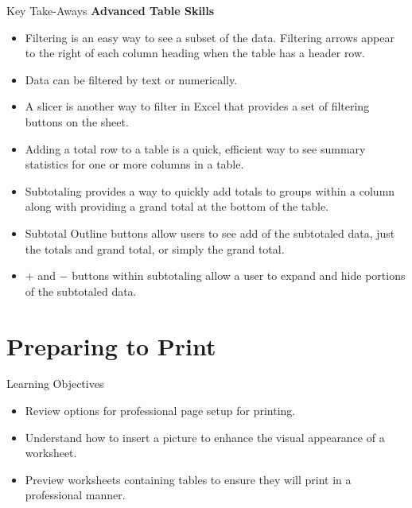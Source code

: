 \begin{center}
	\begin{tkwbox}{Key Take-Aways}
		\textbf{Advanced Table Skills}
		\\
		\begin{itemize}
			\setlength{\itemsep}{0pt}
			\setlength{\parskip}{0pt}
			\setlength{\parsep}{0pt}

			\item Filtering is an easy way to see a subset of the data. Filtering arrows appear to the right of each column heading when the table has a header row.
			\item Data can be filtered by text or numerically.
			\item A slicer is another way to filter in Excel that provides a set of filtering buttons on the sheet.
			\item Adding a total row to a table is a quick, efficient way to see summary statistics for one or more columns in a table.
			\item Subtotaling provides a way to quickly add totals to groups within a column along with providing a grand total at the bottom of the table.
			\item Subtotal Outline buttons allow users to see add of the subtotaled data, just the totals and grand total, or simply the grand total.
			\item $ + $ and $ - $ buttons within subtotaling allow a user to expand and hide portions of the subtotaled data.
			
		\end{itemize}
	\end{tkwbox}
\end{center}

\section{Preparing to Print}

\begin{center}
	\begin{objbox}{Learning Objectives}
		\begin{itemize}
			\setlength{\itemsep}{0pt}
			\setlength{\parskip}{0pt}
			\setlength{\parsep}{0pt}

			\item Review options for professional page setup for printing.
			\item Understand how to insert a picture to enhance the visual appearance of a worksheet.
			\item Preview worksheets containing tables to ensure they will print in a professional manner.
			
		\end{itemize}
	\end{objbox}
\end{center}


